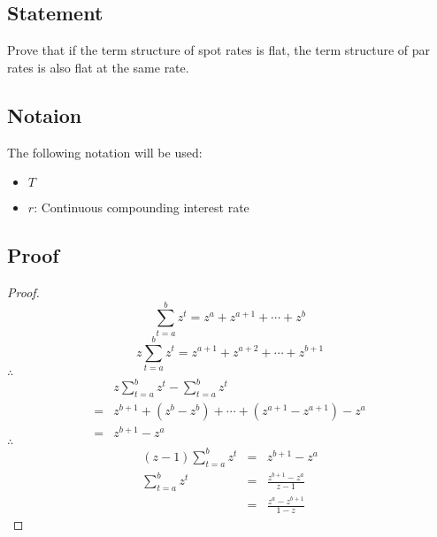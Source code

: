 \subsection{Statement}
Prove that if the term structure of spot rates is flat, the term structure of
par rates is also flat at the same rate.\par

\subsection{Notaion}
The following notation will be used:\par
\begin{itemize}
    \item
    $T$
    \item
    $r$: Continuous compounding interest rate
\end{itemize}

\subsection{Proof}
\begin{proof}
    \[
        \sum\limits_{t = a}^b{z^t} = z^a + z^{a + 1} + \cdots + z^b
    \]
    \[
        z\sum\limits_{t = a}^b{z^t} = z^{a + 1} + z^{a + 2} + \cdots + z^{b + 1}
    \]
    $\therefore$
    \[
        \begin{array}{ll}
            &z\sum\limits_{t = a}^b{z^t} - \sum\limits_{t = a}^b{z^t}\\
            = &
            z^{b + 1} + (z^b - z^b) + \cdots + (z^{a + 1} - z^{a + 1}) - z^a\\
            = &z^{b + 1} - z^a
        \end{array}
    \]
    $\therefore$
    \[
        \begin{array}{lll}
            (z - 1)\sum\limits_{t = a}^b{z^t} &= &z^{b + 1} - z^a\\
            \sum\limits_{t = a}^b{z^t} &= &
            \frac{z^{b + 1} - z^a}{z - 1}\\
            &= &\frac{z^a - z^{b + 1}}{1 - z}
        \end{array}
    \]
\end{proof}
